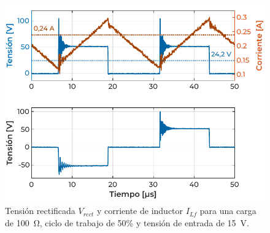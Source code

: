 \begin{figure}[h]
    \centering
    \includegraphics[scale=1]{Imagenes/Con Carga - Caso 1.pdf}
    \caption{Tensión rectificada $V_{rect}$ y corriente de inductor $I_{Lf}$ para una carga de \SI[]{100}{\ohm}, ciclo de trabajo de 50\% y tensión de entrada de \SI[]{15}{\volt}.}
    \label{ConCargaI}
\end{figure}

\lipsum[3]\\